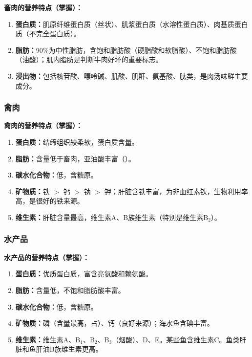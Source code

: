 \begin{keybox}
\textbf{畜肉的营养特点（掌握）：}
\begin{enumerate}[leftmargin=*]
    \item \textbf{蛋白质：}肌原纤维蛋白质（丝状）、肌浆蛋白质（水溶性蛋白质）、肉基质蛋白质（不完全蛋白质）。
    \item \textbf{脂肪：}90\%为中性脂肪，含饱和脂肪酸（硬脂酸和软脂酸）、不饱和脂肪酸（油酸）；肌内脂肪是判断牛肉好坏的重要标志。
    \item \textbf{浸出物：}包括核苷酸、嘌呤碱、肌酸、肌酐、氨基酸、肽类，是肉汤味鲜主要成分。
\end{enumerate}
\end{keybox}

\subsubsection{禽肉}

\begin{keybox}
\textbf{禽肉的营养特点（掌握）：}
\begin{enumerate}[leftmargin=*]
    \item \textbf{蛋白质：}结缔组织较柔软，蛋白质含量。
    \item \textbf{脂肪：}含量低于畜肉，亚油酸丰富（）。
    \item \textbf{碳水化合物：}低，含糖原。
    \item \textbf{矿物质：}铁 $>$ 钙 $>$ 钠 $>$ 钾；肝脏含铁丰富，为非血红素铁，生物利用率高，是很好的铁来源。
    \item \textbf{维生素：}肝脏含量最高，维生素A、B族维生素（特别是维生素B$_2$）。
\end{enumerate}
\end{keybox}

\subsubsection{水产品}

\begin{keybox}
\textbf{水产品的营养特点（掌握）：}
\begin{enumerate}[leftmargin=*]
    \item \textbf{蛋白质：}优质蛋白质，富含亮氨酸和赖氨酸。
    \item \textbf{脂肪：}含量低，不饱和脂肪酸丰富。
    \item \textbf{碳水化合物：}低，含糖原。
    \item \textbf{矿物质：}磷（含量最高，占）、钙（良好来源）；海水鱼含碘丰富。
    \item \textbf{维生素：}维生素A、B$_1$、B$_2$、B$_3$（烟酸）、D、E。某些鱼含维生素C。鱼类肝脏和鱼肝油B族维生素更高。
\end{enumerate}
\end{keybox}

